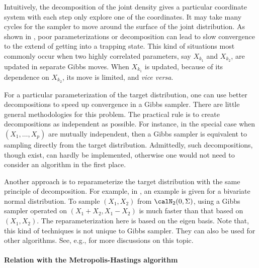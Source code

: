 
Intuitively, the decomposition of the joint density gives a particular
coordinate system with each step only explore one of the coordinates. It may
take many cycles for the sampler to move around the surface of the joint
distribution. As shown in \cite[][note.~9.7.1]{Robert:2004tn}, poor
parameterizations or decomposition can lead to slow convergence to the extend
of getting into a trapping state. This kind of situations most commonly occur
when two highly correlated parameters, say $X_{k_1}$ and $X_{k_2}$, are
updated in separate Gibbs moves. When $X_{k_1}$ is updated, because of its
dependence on $X_{k_2}$, its move is limited, and \emph{vice versa}.

For a particular parameterization of the target distribution, one can use
better decompositions to speed up convergence in a Gibbs sampler. There are
little general methodologies for this problem. The practical rule is to create
decompositions as independent as possible. For instance, in the special case
when $(X_1,\dots,X_p)$ are mutually independent, then a Gibbs sampler is
equivalent to sampling directly from the target distribution. Admittedly, such
decompositions, though exist, can hardly be implemented, otherwise one would
not need to consider an \mcmc algorithm in the first place.

Another approach is to reparameterize the target distribution with the same
principle of decomposition. For example, in
\cite[][sec.~10.4.1]{Robert:2004tn}, an example is given for a bivariate
normal distribution. To sample $(X_1,X_2)$ from $\calN_2(0, \Sigma)$, using a
Gibbs sampler operated on $(X_1 + X_2, X_1 - X_2)$ is much faster than that
based on $(X_1,X_2)$. The reparameterization here is based on the eigen basis.
Note that, this kind of techniques is not unique to Gibbs sampler. They can
also be used for other \mcmc algorithms. See, e.g.,
\cite{Hills:1993vb,Gilks:1996vx} for more discussions on this topic.

\paragraph{Relation with the Metropolis-Hastings algorithm}

